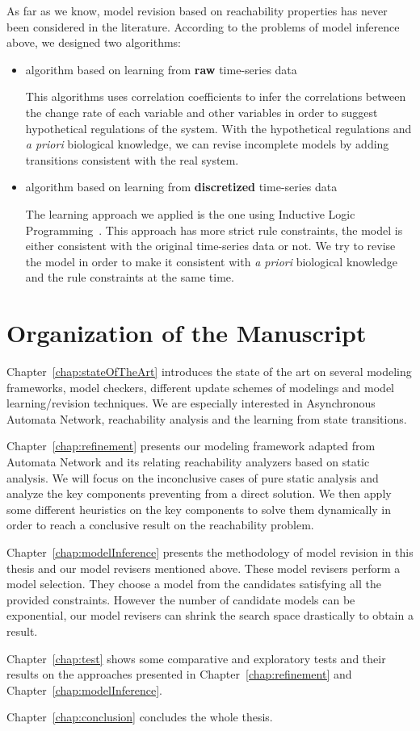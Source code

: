 As far as we know, model revision based on reachability properties has never been considered in the literature.
According to the problems of model inference above, we designed two algorithms:
\begin{itemize}
    \item algorithm based on learning from \textbf{raw} time-series data
    
    This algorithms uses correlation coefficients to infer the correlations between the change rate of each variable and other variables in order to suggest hypothetical regulations of the system.
    With the hypothetical regulations and \textit{a priori} biological knowledge, we can revise incomplete models by adding transitions consistent with the real system.
    \item algorithm based on learning from \textbf{discretized} time-series data
    
    The learning approach we applied is the one using Inductive Logic Programming~\cite{ribeiro2018learning}.
    This approach has more strict rule constraints, the model is either consistent with the original time-series data or not.
    We try to revise the model in order to make it consistent with \textit{a priori} biological knowledge and the rule constraints at the same time.
\end{itemize}


\section{Organization of the Manuscript}
Chapter~\ref{chap:stateOfTheArt} introduces the state of the art on several modeling frameworks, model checkers, different update schemes of modelings and model learning/revision techniques.
We are especially interested in Asynchronous Automata Network, reachability analysis and the learning from state transitions.

Chapter~\ref{chap:refinement} presents our modeling framework adapted from Automata Network and its relating reachability analyzers based on static analysis.
We will focus on the inconclusive cases of pure static analysis and analyze the key components preventing from a direct solution.
We then apply some different heuristics on the key components to solve them dynamically in order to reach a conclusive result on the reachability problem.

Chapter~\ref{chap:modelInference} presents the methodology of model revision in this thesis and our model revisers mentioned above.
These model revisers perform a model selection. 
They choose a model from the candidates satisfying all the provided constraints.
However the number of candidate models can be exponential, our model revisers can shrink the search space drastically to obtain a result.

Chapter~\ref{chap:test} shows some comparative and exploratory tests and their results on the approaches presented in Chapter~\ref{chap:refinement} and Chapter~\ref{chap:modelInference}.

Chapter~\ref{chap:conclusion} concludes the whole thesis.